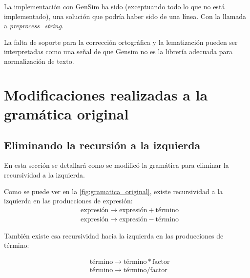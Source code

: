 \documentclass[a4paper,twocolumn]{article}
\begin{document}
    La implementación con GenSim ha sido (exceptuando todo lo que no está implementado),
    una solución que podría haber sido de una línea. Con la llamada a \textit{preprocess\_string}.

    La falta de soporte para la corrección ortográfica y la lematización pueden ser interpretadas como una señal de que Gensim no es la librería adecuada para normalización de texto.




    \clearpage






    \section{Modificaciones realizadas a la gramática original}\label{sec:modificaciones-realizadas-a-la-gramatica-original}

    \subsection {Eliminando la recursión a la izquierda}\label{subsec:eliminando-la-recursion-a-la-izquierda}
    En esta sección se detallará como se modificó la gramática para eliminar la recursividad a la izquierda.


    Como se puede ver en la \autoref{fig:gramatica_original}, existe recursividad a la izquierda en las producciones de expresión:
    \begin{align}
        &\text{expresión} \rightarrow \text{expresión} + \text{término} \\
        &\text{expresión} \rightarrow \text{expresión} - \text{término}
    \end{align}

    También existe esa recursividad hacia la izquierda en las producciones de término:

    \begin{align}
        &\text{término} \rightarrow \text{término} * \text{factor} \\
        &\text{término} \rightarrow \text{término} / \text{factor}
    \end{align}
\end{document}
